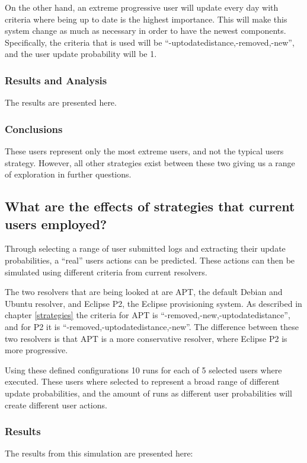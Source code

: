 On the other hand, an extreme progressive user will update every day with criteria where being up to date is the highest importance.
This will make this system change as much as necessary in order to have the newest components.
Specifically, the criteria that is used will be ``-uptodatedistance,-removed,-new'', and the user update probability will be 1.

\subsubsection{Results and Analysis}
The results are presented here.

\subsubsection{Conclusions}
These users represent only the most extreme users, and not the typical users strategy.
However, all other strategies exist between these two giving us a range of exploration in further questions.

\subsection{What are the effects of strategies that current users employed?}
Through selecting a range of user submitted logs and extracting their update probabilities, a ``real'' users actions can be predicted.
These actions can then be simulated using different criteria from current resolvers.

The two resolvers that are being looked at are APT, the default Debian and Ubuntu resolver, and Eclipse P2, the Eclipse provisioning system.
As described in chapter \ref{strategies} the criteria for APT is ``-removed,-new,-uptodatedistance'', and for P2 it is ``-removed,-uptodatedistance,-new''.
The difference between these two resolvers is that APT is a more conservative resolver, where Eclipse P2 is more progressive.

Using these defined configurations 10 runs for each of 5 selected users where executed. 
These users where selected to represent a broad range of different update probabilities, and the amount of runs as different user probabilities will create different user actions.

\cite{}
\subsubsection{Results}
The results from this simulation are presented here:

